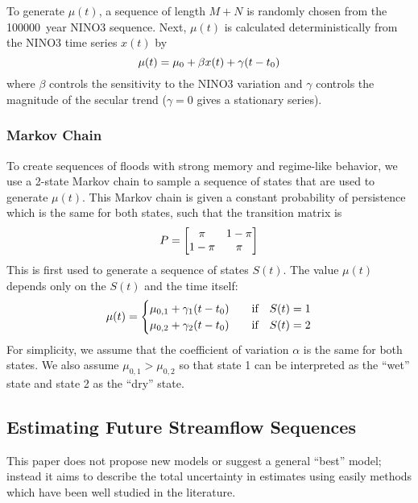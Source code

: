 \documentclass[12pt]{article}
\begin{document}
To generate $\mu(t)$, a sequence of length $M+N$ is randomly chosen from the \SI{100000}{year} NINO3 sequence.
Next, $\mu(t)$ is calculated deterministically from the NINO3 time series $x(t)$ by
\begin{equation}
  \mu(t) = \mu_0 + \beta x(t) + \gamma \qty(t - t_0)
\end{equation}
where $\beta$ controls the sensitivity to the NINO3 variation and $\gamma$ controls the magnitude of the secular trend ($\gamma=0$ gives a stationary series).

\subsubsection{Markov Chain\label{sec:methods-markov}}

To create sequences of floods with strong memory and regime-like behavior, we use a 2-state Markov chain to sample a sequence of states that are used to generate $\mu(t)$.
This Markov chain is given a constant probability of persistence which is the same for both states, such that the transition matrix is
\begin{equation*}
  P = \mqty[\pi & 1-\pi \\ 1-\pi & \pi]
\end{equation*}
This is first used to generate a sequence of states $S(t)$.
The value $\mu(t)$ depends only on the $S(t)$ and the time itself:
\begin{equation*}
  \mu(t) = \begin{cases}
    \mu_{0,1} + \gamma_1 \qty(t - t_0) & \qqtext{if} S(t) = 1 \\
    \mu_{0,2} + \gamma_2 \qty(t - t_0) & \qqtext{if} S(t) = 2
  \end{cases}
\end{equation*}
For simplicity, we assume that the coefficient of variation $\alpha$ is the same for both states.
We also assume $\mu_{0, 1} > \mu_{0, 2}$ so that state 1 can be interpreted as the ``wet'' state and state 2 as the ``dry'' state.

\subsection{Estimating Future Streamflow Sequences\label{sec:estimation}}

This paper does not propose new models or suggest a general ``best'' model; instead it aims to describe the total uncertainty in estimates using easily methods which have been well studied in the literature.
\end{document}
